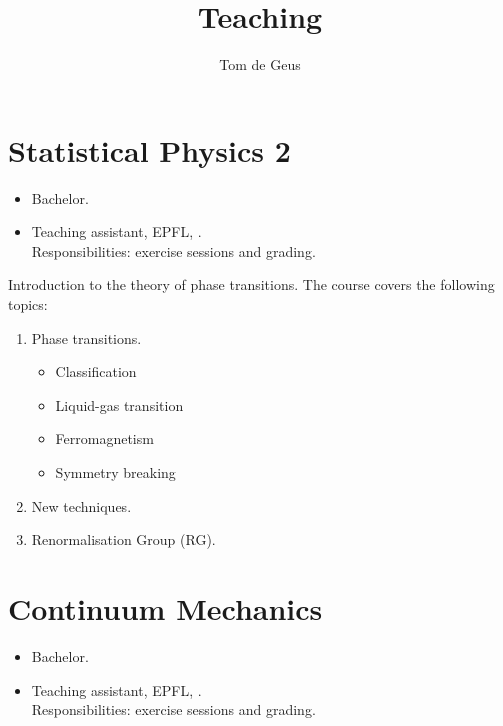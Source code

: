 \documentclass{goose-article}
\title{Teaching}
\author{Tom de Geus}
\begin{document}
\maketitle

\section*{Statistical Physics 2}

\begin{tcolorbox}
    \begin{itemize}
        \item Bachelor.
        \item Teaching assistant, EPFL, \MyDateTeachingEPFLStatPhys.
        \\
        Responsibilities: exercise sessions and grading.
    \end{itemize}
\end{tcolorbox}

\noindent
Introduction to the theory of phase transitions.
The course covers the following topics:

\begin{enumerate}
    \item Phase transitions.
    \begin{itemize}
        \item Classification
        \item Liquid-gas transition
        \item Ferromagnetism
        \item Symmetry breaking
    \end{itemize}
    \item New techniques.
    \item Renormalisation Group (RG).
\end{enumerate}

\section*{Continuum Mechanics}

\begin{tcolorbox}
    \begin{itemize}
        \item Bachelor.
        \item Teaching assistant, EPFL, \MyDateTeachingEPFLContinuum.
        \\
        Responsibilities: exercise sessions and grading.
    \end{itemize}
\end{tcolorbox}
\end{document}
